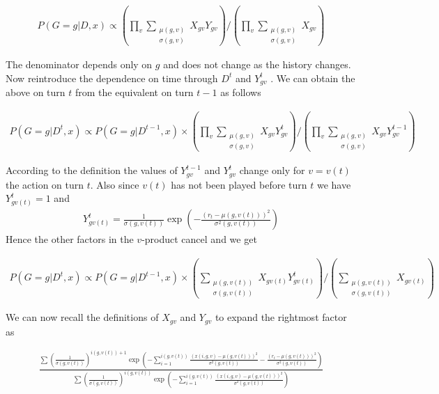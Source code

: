 \documentclass[12pt]{article}
\theoremstyle{definition}
\newcommand{\si}{\ensuremath{\sigma}}
\newcommand{\0}{\ensuremath{\varnothing}}
\newcommand{\1}{{\bf 1}}
\begin{document}
  
  
  \begin{align}    P(G=g| D,x) \propto  
    \left(  \prod_v   \sum_{\substack{\mu(g,v)\\ \si(g,v)}} X_{g v} Y_{gv} \right) / \left( \prod_v   \sum_{\substack{\mu(g,v)\\ \si(g,v)}} X_{g v}   \right) 
  \end{align}
  
  The denominator depends only on $g$ and does not change as the history changes. 
  Now reintroduce the dependence on time through $D^{t}$ and $Y^{t}_{gv}$ . We can obtain the above on turn $t$ from the equivalent on turn $t-1$ as follows
  
  
  
  \begin{align}    P(G=g| D^t,x) \propto   P(G=g| D^{t-1},x) \times
    \left(  \prod_v   \sum_{\substack{\mu(g,v)\\ \si(g,v)}} X_{g v} Y^t_{gv} \right) / \left(  \prod_v   \sum_{\substack{\mu(g,v)\\ \si(g,v)}} X_{g v} Y^{t-1}_{gv} \right) 
  \end{align}
  
  
  According to the definition the values of $Y^{t-1}_{gv}$ and $Y^{t}_{gv}$ change only for $v = v(t)$ the action on turn $t$. Also since $v(t)$ has not been played before turn $t$ we have $Y^{t}_{gv(t)} =1$ and  
  \begin{align*} Y^{t}_{gv(t)} =  \frac{  1}{\si(g,v(t)) } \exp \left(- \frac{(r_t -   \mu(g, v(t)))^2}{  \si^2(g, v(t))}\right)  
  \end{align*}    
   Hence the other factors in the $v$-product cancel and we get
  
  
  \begin{align}    P(G=g| D^t,x) \propto   P(G=g| D^{t-1},x) \times
    \left(   \sum_{\substack{\mu(g,v(t))\\ \si(g,v(t))}} X_{g v(t)} Y^t_{gv(t)} \right) / \left(    \sum_{\substack{\mu(g,v(t))\\ \si(g,v(t))}} X_{g v(t)}  \right) 
  \end{align}
  
  We can now recall the definitions of $X_{gv}$ and $Y_{gv}$ to expand the rightmost factor as  
  
  
  \begin{align}  \displaystyle \frac{\sum \left(  \frac{ 1 }{\si(g,v(t))  } \right)^{i(g,v(t))+1}\exp \left( -\sum_{i=1}^{i(g,v(t))} \frac{(x(i,g,v) - \mu(g,v(t)))^2}{\si^2(g,v(t))} - \frac{(r_t -   \mu(g, v(t)))^2}{  \si^2(g, v(t))} \right)  }{\sum \left(  \frac{ 1 }{  \si(g,v(t))  } \right)^{i(g,v(t))}\exp \left( -\sum_{i=1}^{i(g,v(t))} \frac{(x(i,g,v) - \mu(g,v(t)))^2}{\si^2(g,v(t))}\right) }
  \end{align}
  
\end{document}
